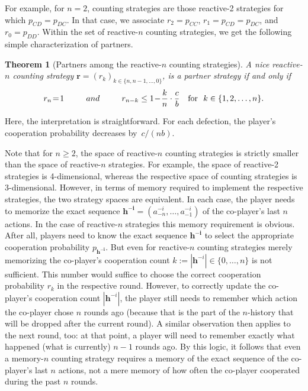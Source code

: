 \documentclass[9pt,twoside,lineno]{pnas-new}
\theoremstyle{plainCl1}
\newtheorem{theorem}{Theorem}
\theoremstyle{plainCl2}
\begin{document}
For example, for $n\!=\!2$, counting strategies are those reactive-2 strategies for which $p_{CD}\!=\!p_{DC}$. 
In that case, we associate $r_2\!=\!p_{CC}$, $r_1\!=\!p_{CD}\!=\!p_{DC}$, and $r_0\!=\!p_{DD}$. 
Within the set of reactive-$n$ counting strategies, we get the following simple characterization of partners. 

\begin{theorem}[Partners among the reactive-$n$ counting strategies]\label{theorem:reactive_counting_partner_strategies}
A nice reactive-$n$ counting strategy $\mathbf{r}\!=\!(r_k)_{k \in \{n, n-1, \dots, 0\}}$,
is a partner strategy if and only if
\begin{equation} \label{Eq:PartnerCounting}
  r_n \!=\! 1 \qquad ~~and~~ \qquad r_{n - k} \le 1 \!-\! \frac{k}{n} \cdot \frac{c}{b} ~~~\text{\normalfont for }~ k \in \{1, 2, \dots, n\}.
\end{equation}
\end{theorem}

\noindent
Here, the interpretation is straightforward.
For each defection, the player's cooperation probability decreases by~$c/(nb)$. 

Note that for $n\!\ge\!2$, the space of reactive-$n$ counting strategies is strictly smaller than the space of reactive-$n$ strategies. 
For example, the space of reactive-2 strategies is 4-dimensional, whereas the respective space of counting strategies is 3-dimensional. 
However, in terms of memory required to implement the respective strategies, the two strategy spaces are equivalent. 
In each case, the player needs to memorize the exact sequence $\mathbf{h^{-i}}\!=\!(a^{-i}_{-n},\ldots, a^{-i}_{-1})$ of the co-player's last $n$ actions. 
In the case of reactive-$n$ strategies this memory requirement is obvious. 
After all, players need to know the exact sequence $\mathbf{h^{-i}}$ to select the appropriate cooperation probability $p_{\mathbf{h^{-i}}}$. 
But even for reactive-$n$ counting strategies merely memorizing the co-player's cooperation count $k:=|\mathbf{h}^{-i}| \in \{0,\ldots,n\}$  is not sufficient. 
This number would suffice to choose the correct cooperation probability $r_k$ in the respective round. 
However, to correctly update the co-player's cooperation count $|\mathbf{h}^{-i}|$, the player still needs to remember which action the co-player chose $n$ rounds ago (because that is the part of the $n$-history that will be dropped after the current round). 
A similar observation then applies to the next round, too: at that point, a player will need to remember exactly what happened (what is currently) $n\!-\!1$ rounds ago. 
By this logic, it follows that even a memory-$n$ counting strategy requires a memory of the exact sequence of the co-player's last $n$ actions, not a mere memory of how often the co-player cooperated during the past $n$ rounds. 
\end{document}
